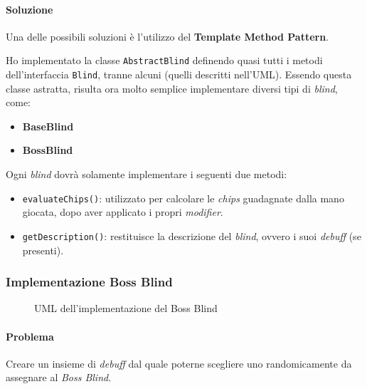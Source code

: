 \documentclass[a4paper,12pt]{report}
\begin{document}
\paragraph{Soluzione}
Una delle possibili soluzioni è l’utilizzo del \textbf{Template Method Pattern}. 

Ho implementato la classe \texttt{AbstractBlind} definendo quasi tutti i metodi dell’interfaccia \texttt{Blind}, tranne alcuni (quelli descritti nell’UML). Essendo questa classe astratta, risulta ora molto semplice implementare diversi tipi di \textit{blind}, come:

\begin{itemize}
    \item \textbf{BaseBlind}
    \item \textbf{BossBlind}
\end{itemize}

Ogni \textit{blind} dovrà solamente implementare i seguenti due metodi:

\begin{itemize}
    \item \texttt{evaluateChips()}: utilizzato per calcolare le \textit{chips} guadagnate dalla mano giocata, dopo aver applicato i propri \textit{modifier}.
    \item \texttt{getDescription()}: restituisce la descrizione del \textit{blind}, ovvero i suoi \textit{debuff} (se presenti).
\end{itemize}

\begin{figure}[h]
    \centering
    \caption{}
\end{figure}

\subsubsection*{Implementazione Boss Blind}

\begin{figure}[H]
	\centering{}
	
	\caption{UML dell’implementazione del Boss Blind}
	\label{img:bossblind}
\end{figure}

\paragraph{Problema}
Creare un insieme di \textit{debuff} dal quale poterne scegliere uno randomicamente da assegnare al \textit{Boss Blind}.
\end{document}

